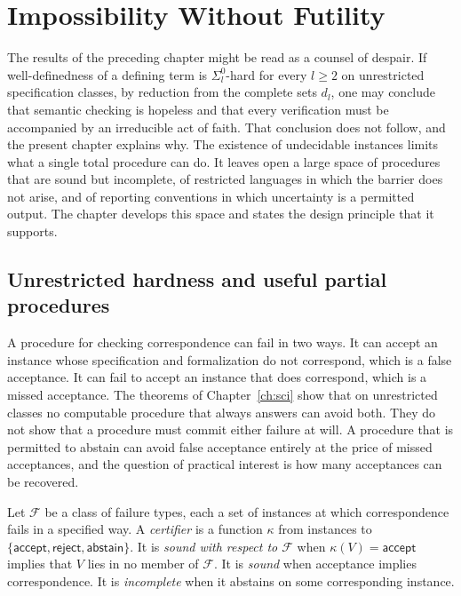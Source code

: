 \chapter{Impossibility Without Futility}
\label{ch:futility}

The results of the preceding chapter might be read as a counsel of despair. If well-definedness of a defining term is $\Sigma^0_l$-hard for every $l \ge 2$ on unrestricted specification classes, by reduction from the complete sets $d_l$, one may conclude that semantic checking is hopeless and that every verification must be accompanied by an irreducible act of faith. That conclusion does not follow, and the present chapter explains why. The existence of undecidable instances limits what a single total procedure can do. It leaves open a large space of procedures that are sound but incomplete, of restricted languages in which the barrier does not arise, and of reporting conventions in which uncertainty is a permitted output. The chapter develops this space and states the design principle that it supports.

\section{Unrestricted hardness and useful partial procedures}

A procedure for checking correspondence can fail in two ways. It can accept an instance whose specification and formalization do not correspond, which is a false acceptance. It can fail to accept an instance that does correspond, which is a missed acceptance. The theorems of Chapter~\ref{ch:sci} show that on unrestricted classes no computable procedure that always answers can avoid both. They do not show that a procedure must commit either failure at will. A procedure that is permitted to abstain can avoid false acceptance entirely at the price of missed acceptances, and the question of practical interest is how many acceptances can be recovered.

\begin{definition}
Let $\mathcal{F}$ be a class of failure types, each a set of instances at which correspondence fails in a specified way. A \emph{certifier} is a function $\kappa$ from instances to $\{\mathsf{accept}, \mathsf{reject}, \mathsf{abstain}\}$. It is \emph{sound with respect to $\mathcal{F}$} when $\kappa(V) = \mathsf{accept}$ implies that $V$ lies in no member of $\mathcal{F}$. It is \emph{sound} when acceptance implies correspondence. It is \emph{incomplete} when it abstains on some corresponding instance.
\end{definition}

